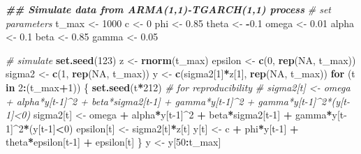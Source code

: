 \documentclass[
]{book}
\newenvironment{Shaded}{\begin{snugshade}}{\end{snugshade}}
\newcommand{\CommentTok}[1]{\textcolor[rgb]{0.56,0.35,0.01}{\textit{#1}}}
\newcommand{\ConstantTok}[1]{\textcolor[rgb]{0.56,0.35,0.01}{#1}}
\newcommand{\ControlFlowTok}[1]{\textcolor[rgb]{0.13,0.29,0.53}{\textbf{#1}}}
\newcommand{\DecValTok}[1]{\textcolor[rgb]{0.00,0.00,0.81}{#1}}
\newcommand{\DocumentationTok}[1]{\textcolor[rgb]{0.56,0.35,0.01}{\textbf{\textit{#1}}}}
\newcommand{\FloatTok}[1]{\textcolor[rgb]{0.00,0.00,0.81}{#1}}
\newcommand{\FunctionTok}[1]{\textcolor[rgb]{0.13,0.29,0.53}{\textbf{#1}}}
\newcommand{\NormalTok}[1]{#1}
\newcommand{\OtherTok}[1]{\textcolor[rgb]{0.56,0.35,0.01}{#1}}
\newcommand{\SpecialCharTok}[1]{\textcolor[rgb]{0.81,0.36,0.00}{\textbf{#1}}}
\begin{document}
\begin{Shaded}
\begin{Highlighting}[]
\DocumentationTok{\#\# Simulate data from ARMA(1,1){-}TGARCH(1,1) process}
\CommentTok{\# set parameters}
\NormalTok{t\_max }\OtherTok{\textless{}{-}} \DecValTok{1000}
\NormalTok{c }\OtherTok{\textless{}{-}} \DecValTok{0}
\NormalTok{phi }\OtherTok{\textless{}{-}} \FloatTok{0.85}
\NormalTok{theta }\OtherTok{\textless{}{-}} \SpecialCharTok{{-}}\FloatTok{0.1}
\NormalTok{omega }\OtherTok{\textless{}{-}} \FloatTok{0.01}
\NormalTok{alpha }\OtherTok{\textless{}{-}} \FloatTok{0.1}
\NormalTok{beta }\OtherTok{\textless{}{-}} \FloatTok{0.85}
\NormalTok{gamma }\OtherTok{\textless{}{-}} \FloatTok{0.05}

\CommentTok{\# simulate}
\FunctionTok{set.seed}\NormalTok{(}\DecValTok{123}\NormalTok{)}
\NormalTok{z }\OtherTok{\textless{}{-}} \FunctionTok{rnorm}\NormalTok{(t\_max)}
\NormalTok{epsilon }\OtherTok{\textless{}{-}} \FunctionTok{c}\NormalTok{(}\DecValTok{0}\NormalTok{, }\FunctionTok{rep}\NormalTok{(}\ConstantTok{NA}\NormalTok{, t\_max))}
\NormalTok{sigma2 }\OtherTok{\textless{}{-}} \FunctionTok{c}\NormalTok{(}\DecValTok{1}\NormalTok{, }\FunctionTok{rep}\NormalTok{(}\ConstantTok{NA}\NormalTok{, t\_max))}
\NormalTok{y     }\OtherTok{\textless{}{-}} \FunctionTok{c}\NormalTok{(sigma2[}\DecValTok{1}\NormalTok{]}\SpecialCharTok{*}\NormalTok{z[}\DecValTok{1}\NormalTok{], }\FunctionTok{rep}\NormalTok{(}\ConstantTok{NA}\NormalTok{, t\_max))}
\ControlFlowTok{for}\NormalTok{ (t }\ControlFlowTok{in} \DecValTok{2}\SpecialCharTok{:}\NormalTok{(t\_max}\SpecialCharTok{+}\DecValTok{1}\NormalTok{)) \{}
  \FunctionTok{set.seed}\NormalTok{(t}\SpecialCharTok{*}\DecValTok{212}\NormalTok{) }\CommentTok{\# for reproducibility}
  \CommentTok{\# sigma2[t]  \textless{}{-} omega + alpha*y[t{-}1]\^{}2 + beta*sigma2[t{-}1] + gamma*y[t{-}1]\^{}2 + gamma*y[t{-}1]\^{}2*(y[t{-}1]\textless{}0)}
\NormalTok{  sigma2[t]  }\OtherTok{\textless{}{-}}\NormalTok{ omega }\SpecialCharTok{+}\NormalTok{ alpha}\SpecialCharTok{*}\NormalTok{y[t}\DecValTok{{-}1}\NormalTok{]}\SpecialCharTok{\^{}}\DecValTok{2} \SpecialCharTok{+}\NormalTok{ beta}\SpecialCharTok{*}\NormalTok{sigma2[t}\DecValTok{{-}1}\NormalTok{] }\SpecialCharTok{+}\NormalTok{ gamma}\SpecialCharTok{*}\NormalTok{y[t}\DecValTok{{-}1}\NormalTok{]}\SpecialCharTok{\^{}}\DecValTok{2}\SpecialCharTok{*}\NormalTok{(y[t}\DecValTok{{-}1}\NormalTok{]}\SpecialCharTok{\textless{}}\DecValTok{0}\NormalTok{)}
\NormalTok{  epsilon[t] }\OtherTok{\textless{}{-}}\NormalTok{ sigma2[t]}\SpecialCharTok{*}\NormalTok{z[t]}
\NormalTok{  y[t]       }\OtherTok{\textless{}{-}}\NormalTok{ c }\SpecialCharTok{+}\NormalTok{ phi}\SpecialCharTok{*}\NormalTok{y[t}\DecValTok{{-}1}\NormalTok{] }\SpecialCharTok{+}\NormalTok{ theta}\SpecialCharTok{*}\NormalTok{epsilon[t}\DecValTok{{-}1}\NormalTok{] }\SpecialCharTok{+}\NormalTok{ epsilon[t]}
\NormalTok{\}}
\NormalTok{y }\OtherTok{\textless{}{-}}\NormalTok{ y[}\DecValTok{50}\SpecialCharTok{:}\NormalTok{t\_max]}
\end{Highlighting}
\end{Shaded}
\end{document}
